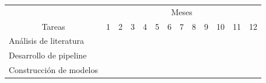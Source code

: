 \documentclass[
    left=2.0cm,         %
    right=2.0cm,        %
    top=2.0cm,          %
    bottom=2.5cm,         %
    bindingoffset=6mm,  %
    nohyphenation=false %
]{eiti/eiti-thesis}
\begin{document}
\begin{table}[h]
\begin{tabular}{|l|l|l|l|l|l|l|l|l|l|l|l|l|}
\hline
\multicolumn{1}{|c|}{}                         & \multicolumn{12}{c|}{Meses}                                                                                                                                                                                                                                                                                                                                                                                                                                                 \\ \cline{2-13} 
\multicolumn{1}{|c|}{\multirow{-2}{*}{Tareas}} & 1                                               & 2                                               & 3                        & 4                        & 5                                               & 6                        & 7                                               & 8                                               & 9                        & 10                                              & 11                       & 12                       \\ \hline
Análisis de literatura                         & \cellcolor[HTML]{000000}{\color[HTML]{000000} } & \cellcolor[HTML]{000000}{\color[HTML]{000000} } &                          &                          &                                                 &                          &                                                 &                                                 &                          &                                                 &                          &                          \\ \hline
Desarrollo de pipeline                         &                                                 & \cellcolor[HTML]{000000}                        & \cellcolor[HTML]{000000} &                          &                                                 &                          &                                                 &                                                 &                          &                                                 &                          &                          \\ \hline
Construcción de modelos                        &                                                 &                                                 & \cellcolor[HTML]{000000} & \cellcolor[HTML]{000000} & \cellcolor[HTML]{000000}{\color[HTML]{000000} } &                          &                                                 &                                                 &                          &                                                 &                          &                          \\ \hline

\end{tabular}
\end{table}
\end{document}
